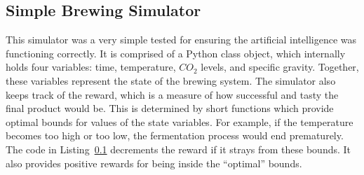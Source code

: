 \documentclass[draftclsnofoot,onecolumn,letterpaper,10pt]{IEEEtran}
\begin{document}
\subsection{Simple Brewing Simulator}
\label{lst:temp_reward}
This simulator was a very simple tested for ensuring the artificial intelligence was functioning correctly. It is comprised of a Python class object, which internally holds four variables: time, temperature, $CO_2$ levels, and specific gravity. Together, these variables represent the state of the brewing system. The simulator also keeps track of the reward, which is a measure of how successful and tasty the final product would be. This is determined by short functions which provide optimal bounds for values of the state variables. For example, if the temperature becomes too high or too low, the fermentation process would end prematurely. The code in Listing~\ref{lst:temp_reward} decrements the reward if it strays from these bounds. It also provides positive rewards for being inside the ``optimal'' bounds.
\end{document}
